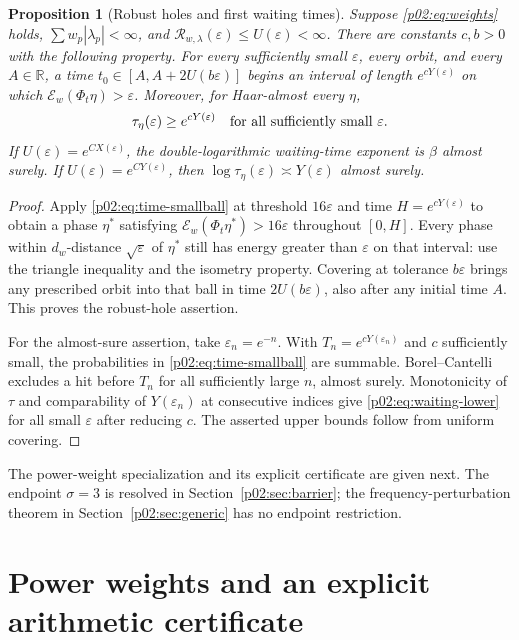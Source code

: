 \documentclass[11pt,letterpaper]{article}
\newtheorem{proposition}[theorem]{Proposition}
\theoremstyle{definition}
\theoremstyle{remark}
\newcommand{\R}{\mathbb R}
\newcommand{\eps}{\varepsilon}
\newcommand{\1}{\mathbf 1}
\begin{document}
\begin{proposition}[Robust holes and first waiting times]\label{p02:prop:holes}
Suppose \eqref{p02:eq:weights} holds, $\sum w_p|\lambda_p|<\infty$, and
$\mathcal R_{w,\lambda}(\eps)\le U(\eps)<\infty$.
There are constants $c,b>0$ with the following property. For every
sufficiently small $\eps$, every orbit, and every $A\in\R$, a time
$t_0\in[A,A+2U(b\eps)]$ begins an interval of length
$e^{cY(\eps)}$ on which $\mathcal E_w(\Phi_t\eta)>\eps$.
Moreover, for Haar-almost every $\eta$,
\begin{equation}\label{p02:eq:waiting-lower}
 \tau_\eta(\eps)\ge e^{cY(\eps)}
 \quad\hbox{for all sufficiently small }\eps.
\end{equation}
If $U(\eps)=e^{CX(\eps)}$, the double-logarithmic waiting-time
exponent is $\beta$ almost surely. If $U(\eps)=e^{CY(\eps)}$,
then $\log\tau_\eta(\eps)\asymp Y(\eps)$ almost surely.
\end{proposition}
\begin{proof}
Apply \eqref{p02:eq:time-smallball} at threshold $16\eps$ and time
$H=e^{cY(\eps)}$ to obtain a phase $\eta^*$ satisfying
$\mathcal E_w(\Phi_t\eta^*)>16\eps$ throughout $[0,H]$.
Every phase within $d_w$-distance $\sqrt\eps$ of $\eta^*$ still
has energy greater than $\eps$ on that interval: use the triangle
inequality and the isometry property. Covering at tolerance $b\eps$
brings any prescribed orbit into that ball in time $2U(b\eps)$,
also after any initial time $A$. This proves the robust-hole assertion.

For the almost-sure assertion, take $\eps_n=e^{-n}$. With
$T_n=e^{cY(\eps_n)}$ and $c$ sufficiently small, the probabilities
in \eqref{p02:eq:time-smallball} are summable. Borel--Cantelli excludes
a hit before $T_n$ for all sufficiently large $n$, almost surely.
Monotonicity of $\tau$ and comparability of $Y(\eps_n)$ at consecutive
indices give \eqref{p02:eq:waiting-lower} for all small $\eps$ after
reducing $c$. The asserted upper bounds follow from uniform covering.
\end{proof}

The power-weight specialization and its explicit certificate are given next.
The endpoint $\sigma=3$ is resolved in Section~\ref{p02:sec:barrier};
the frequency-perturbation theorem in Section~\ref{p02:sec:generic}
has no endpoint restriction.

\section{Power weights and an explicit arithmetic certificate}\label{sec:power-certificate}
\end{document}
